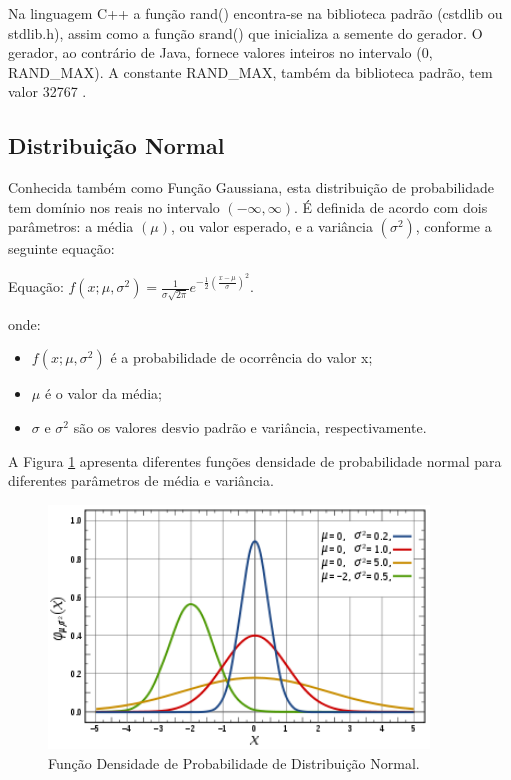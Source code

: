 Na linguagem C++ a função rand() encontra-se na biblioteca padrão (cstdlib ou stdlib.h), assim como a função srand() que inicializa a semente do gerador. O gerador, ao contrário de Java, fornece valores inteiros no intervalo (0, RAND_MAX). A constante RAND_MAX, também da biblioteca padrão, tem valor 32767 \cite{cppreference}.

\subsection{Distribuição Normal}

Conhecida também como Função Gaussiana, esta distribuição de probabilidade tem domínio nos reais no intervalo \((-\infty, \infty)\). É definida de acordo com dois parâmetros: a média \((\mu)\), ou valor esperado, e a variância \((\sigma^{2})\), conforme a seguinte equação:

Equação: \(f(x; \mu, \sigma^2) = \frac{1}{\sigma\sqrt{2\pi}}e^{-\frac{1}{2}(\frac{x - \mu}{\sigma})^2}\).

onde:
\begin{itemize}
	\item \(f(x; \mu, \sigma^2)\) é a probabilidade de ocorrência do valor x;
	\item \(\mu\) é o valor da média;
	\item \(\sigma\) e \(\sigma^{2}\) são os valores desvio padrão e variância, respectivamente.
\end{itemize}

A Figura \ref{fig:normaldist} apresenta diferentes funções densidade de probabilidade normal para diferentes parâmetros de média e variância.

\begin{figure}[!htb]
	\centering
	\includegraphics[width=0.9\textwidth]{./imgs/normaldist.png}
	\caption{Função Densidade de Probabilidade de Distribuição Normal.}
	\label{fig:normaldist}
\end{figure}

